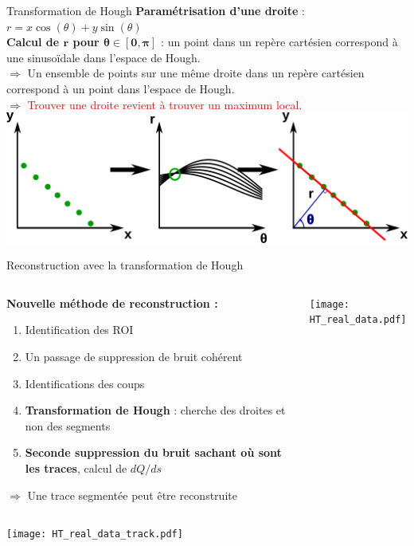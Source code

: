     \begin{frame}{Transformation de Hough}
        \textbf{Paramétrisation d'une droite }: $r=x\cos(\theta)+y\sin(\theta)$\\
        \textbf{Calcul de $\boldsymbol{r}$ pour $\boldsymbol{\theta\in[0,\pi]}$} : un point dans un repère cartésien correspond à une sinusoïdale dans l'espace de Hough.\\
        $\Rightarrow$ Un ensemble de points sur une même droite dans un repère cartésien correspond à un point dans l'espace de Hough.\\
        $\Rightarrow$ \textcolor{red}{Trouver une droite revient à trouver un maximum local}.\\\vfill
        \includegraphics[width=\textwidth]{./pictures/HT.pdf}
    \end{frame}

    \begin{frame}{Reconstruction avec la transformation de Hough}
        \begin{scriptsize}
            \begin{columns}
                \begin{column}{0.5\textwidth}
                    \textbf{Nouvelle méthode de reconstruction :}
                    \begin{enumerate}
                        \item Identification des ROI
                        \item Un passage de suppression de bruit cohérent
                        \item Identifications des coups
                        \item \textbf{Transformation de Hough} : cherche des droites et non des segments
                        \item \textbf{Seconde suppression du bruit sachant où sont les traces}, calcul de $dQ/ds$
                    \end{enumerate}
                    $\Rightarrow$ Une trace segmentée peut être reconstruite
                \end{column}
                \begin{column}{0.5\textwidth}
                    \centering \texttt{[image: HT\_real\_data.pdf]}
                \end{column}
            \end{columns}
            \begin{center} \texttt{[image: HT\_real\_data\_track.pdf]} \end{center}
        \end{scriptsize}
    \end{frame}

